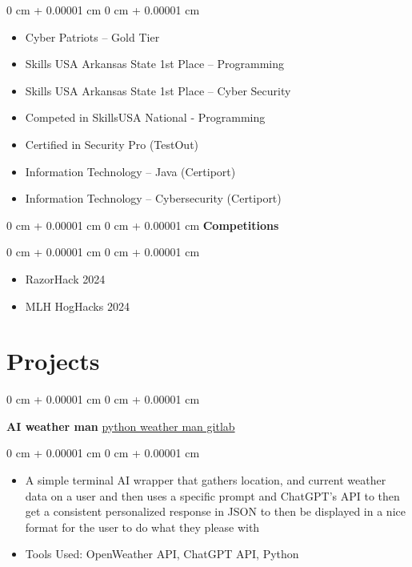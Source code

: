 \documentclass[10pt, letterpaper]{article}
\newenvironment{highlights}{
    \begin{itemize}[
        topsep=0.10 cm,
        parsep=0.10 cm,
        partopsep=0pt,
        itemsep=0pt,
        leftmargin=0 cm + 10pt
    ]
}{
    \end{itemize}
} %
\newenvironment{onecolentry}{
    \begin{adjustwidth}{
        0 cm + 0.00001 cm
    }{
        0 cm + 0.00001 cm
    }
}{
    \end{adjustwidth}
} %
\newenvironment{twocolentry}[2][]{
    \onecolentry
    \def\secondColumn{#2}
    \setcolumnwidth{\fill, 4.5 cm}
    \begin{paracol}{2}
}{
    \switchcolumn \raggedleft \secondColumn
    \end{paracol}
    \endonecolentry
} %
\begin{document}
        \vspace{0.10 cm}
        \begin{onecolentry}
            \begin{highlights}
                \item Cyber Patriots – Gold Tier
                \item Skills USA Arkansas State 1st Place – Programming
                \item Skills USA Arkansas State 1st Place – Cyber Security
                \item Competed in SkillsUSA National - Programming 
                \item Certified in Security Pro (TestOut)
                \item Information Technology – Java (Certiport)
                \item Information Technology – Cybersecurity (Certiport)
            \end{highlights}
        \end{onecolentry}
        \vspace{0.10 cm}
       \begin{onecolentry}{
        }
            \textbf{Competitions}\end{onecolentry}
            
        \vspace{0.10 cm}
        \begin{onecolentry}
            \begin{highlights}
                \item RazorHack 2024 
                \item MLH HogHacks 2024
            \end{highlights}
        \end{onecolentry}


    \section{Projects}

        \begin{twocolentry}{
            \href{https://gitlab.com/paradigms1/pythonaiwetherman}{python weather man gitlab}
        }
            \textbf{AI weather man}\end{twocolentry}

        \vspace{0.10 cm}
        \begin{onecolentry}
            \begin{highlights}
                \item A simple terminal AI wrapper that gathers location, and current weather data on a user and then uses a specific prompt and ChatGPT's API to then get a consistent personalized response in JSON to then be displayed in a nice format for the user to do what they please with
                \item Tools Used: OpenWeather API, ChatGPT API, Python 
            \end{highlights}
        \end{onecolentry}
\end{document}

